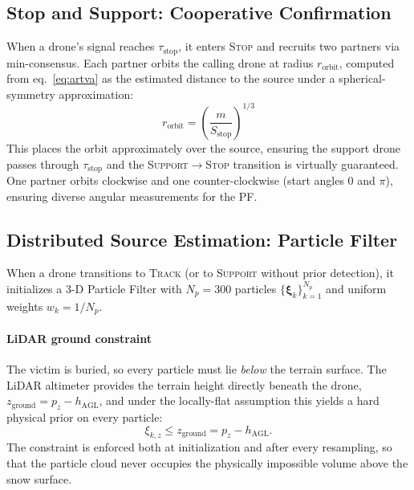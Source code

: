 \documentclass[journal,10pt,twocolumn]{IEEEtran}
\begin{document}
\subsection{Stop and Support: Cooperative Confirmation}
\label{sec:stop_support}
When a drone's signal reaches $\tau_{\text{stop}}$, it enters
\textsc{Stop} and recruits two partners via min-consensus.
Each partner orbits the calling drone at radius $r_{\text{orbit}}$,
computed from eq.~\eqref{eq:artva} as the estimated distance to the
source under a spherical-symmetry approximation:
\begin{equation}
  r_{\text{orbit}} = \left(\frac{m}{S_{\text{stop}}}\right)^{1/3}
  \label{eq:orbit_r}
\end{equation}
This places the orbit approximately over the source, ensuring the
support drone passes through $\tau_{\text{stop}}$ and the
\textsc{Support}$\to$\textsc{Stop} transition is virtually guaranteed.
One partner orbits clockwise and one counter-clockwise (start angles
$0$ and $\pi$), ensuring diverse angular measurements for the PF.

\subsection{Distributed Source Estimation: Particle Filter}
\label{sec:pf}

When a drone transitions to \textsc{Track} (or to \textsc{Support} without
prior detection), it initializes a 3-D Particle Filter with $N_p = 300$
particles $\{\bm{\xi}_k\}_{k=1}^{N_p}$ and uniform weights $w_k = 1/N_p$.

\paragraph{LiDAR ground constraint}
The victim is buried, so every particle must lie \emph{below} the terrain
surface.  The LiDAR altimeter provides the terrain height directly beneath
the drone, $z_{\text{ground}} = p_z - h_{\text{AGL}}$, and under the
locally-flat assumption this yields a hard physical prior on every particle:
\begin{equation}
  \xi_{k,z} \leq z_{\text{ground}} = p_z - h_{\text{AGL}}.
  \label{eq:pf_ground}
\end{equation}
The constraint is enforced both at initialization and after every
resampling, so that the particle cloud never occupies the
physically impossible volume above the snow surface.
\end{document}
